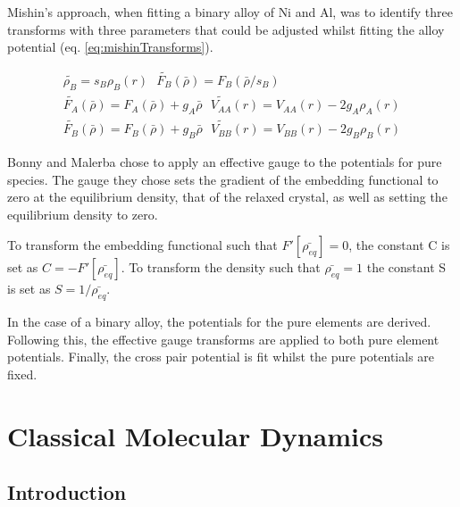 Mishin's approach, when fitting a binary alloy of \Gls{Ni} and \Gls{Al}, was to identify three transforms with three parameters that could be adjusted whilst fitting the alloy potential (eq. \ref{eq:mishinTransforms}).

\begin{equation}
\begin{split}
\tilde{\rho_B} = s_B \rho_B(r) \text{    } \tilde{F_B}(\bar{\rho}) = F_B (\bar{\rho}/s_B) \\
\tilde{F_A} (\bar{\rho}) = F_A (\bar{\rho}) + g_A \bar{\rho}  \text{    } \tilde{V_{AA}}(r) = V_{AA}(r) - 2g_A \rho_A (r) \\
\tilde{F_B} (\bar{\rho}) = F_B (\bar{\rho}) + g_B \bar{\rho}  \text{    } \tilde{V_{BB}}(r) = V_{BB}(r) - 2g_B \rho_B (r)
\end{split}
\label{eq:mishinTransforms}
\end{equation}

Bonny and Malerba chose to apply an effective gauge to the potentials for pure species.  The gauge they chose sets the gradient of the embedding functional to zero at the equilibrium density, that of the relaxed crystal, as well as setting the equilibrium density to zero.

To transform the embedding functional such that $F'[\bar{\rho_{eq}}] = 0$, the constant C is set as $C = -F'[\bar{\rho_{eq}}]$.  To transform the density such that $\bar{\rho_{eq}} = 1$ the constant S is set as $S = 1 / \bar{\rho_{eq}}$\cite{bonnymalerba}.

In the case of a binary alloy, the potentials for the pure elements are derived.  Following this, the effective gauge transforms are applied to both pure element potentials.  Finally, the cross pair potential is fit whilst the pure potentials are fixed.









\section{Classical Molecular Dynamics}

\subsection{Introduction}


